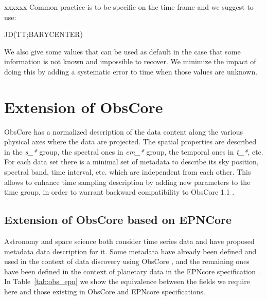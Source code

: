 \documentclass[11pt,a4paper]{ivoa}
\begin{document}
xxxxxx Common practice is to be specific on the time frame and we suggest to use:
\begin{center}
  JD(TT;BARYCENTER)
\end{center}
We also give some values that can be used as default in the case that some information is not known and impossible to recover. We minimize the impact of doing this by adding a systematic error to time when those values are unknown.

\section{Extension of ObsCore}
ObsCore has a normalized description of the data content along the various physical axes where the data are projected.
The spatial properties are described in the \emph{s\_*} group, the spectral ones in \emph{em\_*} group, the temporal ones in \emph{t\_*}, etc.
For each data set there is a minimal  set of metadata to describe its sky position, spectral band, time interval, etc. which are independent from each other.
This allows to enhance time sampling description by adding new parameters to the time group, in order to warrant backward compatibility to ObsCore 1.1 . 

\subsection{Extension of ObsCore based on EPNCore}
Astronomy and space science both consider time series data and have proposed metadata data description for it. Some metadata have already been defined and used in the context of data discovery using ObsCore \cite{2017ivoa.spec.0509L}, and the remaining ones have been defined in the context of planetary data in the EPNcore specification \cite{2022ivoa.spec.0822E}. In Table~\ref{tab:obs_epn} we show the equivalence between the fields we require here and those existing in  ObsCore and EPNcore specifications.
\end{document}
